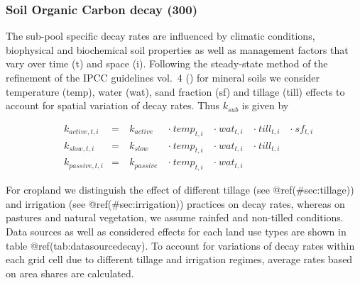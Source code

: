 \documentclass[gc, manuscript]{copernicus}
\begin{document}
\hypertarget{sec:tier2}{%
\subsubsection{Soil Organic Carbon decay (300)}\label{sec:tier2}}

The sub-pool specific decay rates are influenced by climatic conditions,
biophysical and biochemical soil properties as well as management
factors that vary over time (t) and space (i). Following the
steady-state method of the refinement of the IPCC guidelines vol.~4
(\citet{ipcc_2019_2019}) for mineral soils we consider temperature
(temp), water (wat), sand fraction (sf) and tillage (till) effects to
account for spatial variation of decay rates. Thus \(k_{sub}\) is given
by

\begin{equation}
\begin{aligned}
& k_{active,t,i}  & = &~ k_{active}  ~ &\cdot~ temp_{t,i} ~ &\cdot~ wat_{t,i} ~ &\cdot~ till_{t,i} ~ & \cdot~ sf_{t,i}\\
& k_{slow,t,i}    & = &~ k_{slow}    ~ &\cdot~ temp_{t,i} ~ &\cdot~ wat_{t,i} ~ &\cdot~ till_{t,i} ~ &\\
& k_{passive,t,i} & = &~ k_{passive} ~ &\cdot~ temp_{t,i} ~ &\cdot~ wat_{t,i} ~ & ~ &
\label{eq:decayrates}
\end{aligned}
\end{equation}

For cropland we distinguish the effect of different tillage (see
@ref(\#sec:tillage)) and irrigation (see @ref(\#sec:irrigation))
practices on decay rates, whereas on pastures and natural vegetation, we
assume rainfed and non-tilled conditions. Data sources as well as
considered effects for each land use types are shown in table
@ref(tab:datasourcedecay). To account for variations of decay rates
within each grid cell due to different tillage and irrigation regimes,
average rates based on area shares are calculated.
\end{document}
